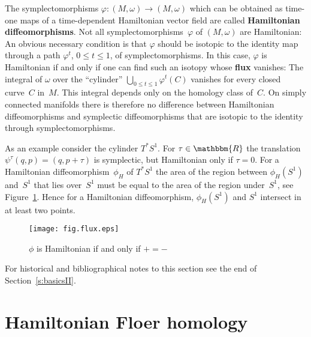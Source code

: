 \documentclass[12pt,twoside]{amsart}
\theoremstyle{plain}
\numberwithin{figure}{section}
\numberwithin{equation}{section}
\def\RR{\mathbbm{R}}
\begin{document}
The symplectomorphisms $\varphi \colon (M,\omega) \rightarrow (M,\omega)$ which can be obtained as time-one maps of a time-dependent Hamiltonian vector field are called 
{\bf Hamiltonian diffeomorphisms}. 
Not all symplectomorphisms~$\varphi$ of $(M,\omega)$ are Hamiltonian: 
An obvious necessary condition is that $\varphi$ should be isotopic to the identity map
through a path $\varphi^t$, $0 \leqslant t \leqslant 1$, of symplectomorphisms.
In this case, $\varphi$ is Hamiltonian if and only if one can find such an isotopy whose 
{\bf flux} vanishes:
The integral of $\omega$ over the ``cylinder'' $\bigcup_{0 \leqslant t \leqslant 1} \varphi^t(C)$
vanishes for every closed curve~$C$ in~$M$.
%
This integral depends only on the homology class of~$C$.
On simply connected manifolds there is therefore no difference between Hamiltonian diffeomorphisms and symplectic diffeomorphisms that are isotopic to the identity 
through symplectomorphisms.

As an example consider the cylinder $T^*S^1$. 
For $\tau \in \RR$ the translation $\psi^\tau (q,p) = (q,p+\tau)$ is symplectic, 
but Hamiltonian only if $\tau =0$.
For a Hamiltonian diffeomorphism~$\phi_H$ of $T^*S^1$ the area of the region 
between $\phi_H(S^1)$ and~$S^1$ that lies over~$S^1$ must be equal to the area of the region under~$S^1$, 
see Figure~\ref{fig.flux}.
Hence for a Hamiltonian diffeomorphism, $\phi_H (S^1)$ and $S^1$ intersect in at least
two points.

%
\begin{figure}[h]   
 \begin{center} 
  \psfrag{+}{$+$}
  \leavevmode\texttt{[image: fig.flux.eps]}
 \end{center}
 \caption{$\phi$ is Hamiltonian if and only if $+ = -$}
 \label{fig.flux}
\end{figure}
%

For historical and bibliographical notes to this section see the end of Section~\ref{s:basicsII}. 




\section{Hamiltonian Floer homology} \label{s:Ham}
\end{document}

